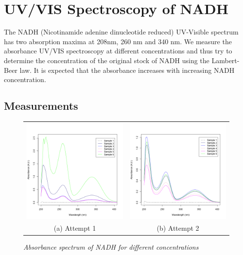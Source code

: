\documentclass[a4paper,10pt]{article}
\begin{document}
    \pagebreak

    \section{UV/VIS Spectroscopy of NADH}
    The NADH (Nicotinamide adenine dinucleotide reduced) UV-Visible spectrum has two absorption maxima at 
    208nm, 260 nm and 340 nm. We measure the absorbance UV/VIS spectroscopy at different concentrations and thus 
    try to determine the concentration of the original stock of NADH using the Lambert-Beer law.
    It is expected that the absorbance increases with increasing NADH concentration. 
    
        \subsection*{Measurements}
            \begin{figure}[H]
                \centering
                \begin{tabular}{c c}
                    \includegraphics[width=215px]{../resources/absorption_r1_spectrum.png} &
                    \includegraphics[width=215px]{../resources/absorption_r2_spectrum.png} \\
                    (a) Attempt 1 & (b) Attempt 2\\
                \end{tabular}
                \caption{\it Absorbance spectrum of NADH for different concentrations}\label{fig:abs_spectrum}
            \end{figure}
\end{document}
